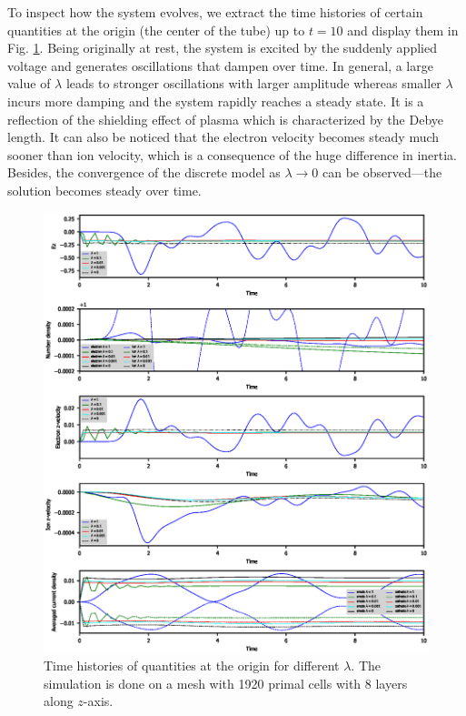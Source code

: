 \documentclass{report}
\begin{document}
To inspect how the system evolves, we extract the time histories of certain quantities at the origin (the center of the tube) up to $t = 10$ and display them in Fig. \ref{fig:origin-data_vs_time}. Being originally at rest, the system is excited by the suddenly applied voltage and generates oscillations that dampen over time. In general, a large value of $\lambda$ leads to stronger oscillations with larger amplitude whereas smaller $\lambda$ incurs more damping and the system rapidly reaches a steady state. It is a reflection of the shielding effect of plasma which is characterized by the Debye length. It can also be noticed that the electron velocity becomes steady much sooner than ion velocity, which is a consequence of the huge difference in inertia. Besides, the convergence of the discrete model as $\lambda \rightarrow 0$ can be observed---the solution becomes steady over time.
\begin{figure}
    \centering
    \includegraphics[scale=0.9]{origin-data_vs_time.eps}
    \caption{Time histories of quantities at the origin for different $\lambda$. The simulation is done on a mesh with 1920 primal cells with 8 layers along $z$-axis.}
    \label{fig:origin-data_vs_time}
\end{figure}
\end{document}
